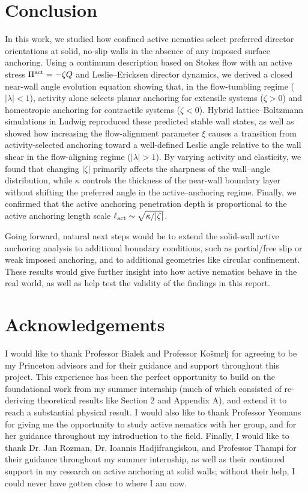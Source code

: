 \documentclass[11pt]{article}
\begin{document}
\section{Conclusion}

In this work, we studied how confined active nematics select preferred director orientations at solid, no-slip walls in the absence of any imposed surface anchoring. Using a continuum description based on Stokes flow with an active stress $\Pi^{\rm act}=-\zeta Q$ and Leslie--Ericksen director dynamics, we derived a closed near-wall angle evolution equation showing that, in the flow-tumbling regime ($|\lambda|<1$), activity alone selects planar anchoring for extensile systems ($\zeta>0$) and homeotropic anchoring for contractile systems ($\zeta<0$). Hybrid lattice--Boltzmann simulations in Ludwig reproduced these predicted stable wall states, as well as showed how increasing the flow-alignment parameter $\xi$ causes a transition from activity-selected anchoring toward a well-defined Leslie angle relative to the wall shear in the flow-aligning regime ($|\lambda|>1$). By varying activity and elasticity, we found that changing $|\zeta|$ primarily affects the sharpness of the wall--angle distribution, while $\kappa$ controls the thickness of the near-wall boundary layer without shifting the preferred angle in the active--anchoring regime. Finally, we confirmed that the active anchoring penetration depth is proportional to the active anchoring length scale $\ell_{\rm act}\sim\sqrt{\kappa/|\zeta|}$.

Going forward, natural next steps would be to extend the solid-wall active anchoring analysis to additional boundary conditions, such as partial/free slip or weak imposed anchoring, and to additional geometries like circular confinement. These results would give further insight into how active nematics behave in the real world, as well as help test the validity of the findings in this report.

\section*{Acknowledgements}

I would like to thank Professor Bialek and Professor Košmrlj for agreeing to be my Princeton advisors and for their guidance and support throughout this project. This experience has been the perfect opportunity to build on the foundational work from my summer internship (much of which consisted of re-deriving theoretical results like Section 2 and Appendix A), and extend it to reach a substantial physical result. I would also like to thank Professor Yeomans for giving me the opportunity to study active nematics with her group, and for her guidance throughout my introduction to the field. Finally, I would like to thank Dr. Jan Rozman, Dr. Ioannis Hadjifrangiskou, and Professor Thampi for their guidance throughout my summer internship, as well as their continued support in my research on active anchoring at solid walls; without their help, I could never have gotten close to where I am now.
\end{document}
